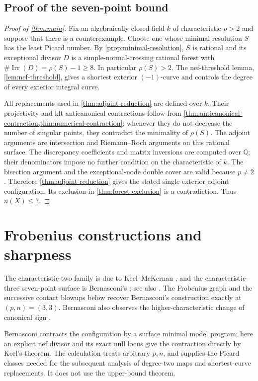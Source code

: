 \documentclass[11pt,reqno]{amsart}
\theoremstyle{definition}
\theoremstyle{remark}
\DeclareMathOperator{\Irr}{Irr}
\newcommand{\QQ}{\mathbb Q}
\numberwithin{equation}{section}
\begin{document}
\subsection{Proof of the seven-point bound}
\begin{proof}[Proof of \cref{thm:main}]
Fix an algebraically closed field $k$ of characteristic $p>2$ and
suppose that there is a counterexample. Choose one whose minimal
resolution $S$ has the least Picard number. By
\cref{prop:minimal-resolution}, $S$ is rational and its exceptional divisor
$D$ is a simple-normal-crossing rational forest with
$\#\Irr(D)=\rho(S)-1\ge8$. In particular $\rho(S)>2$.
The nef-threshold lemma, \cref{lem:nef-threshold}, gives a
shortest exterior $(-1)$-curve and controls the degree of every
exterior integral curve.

All replacements used in \cref{thm:adjoint-reduction}
are defined over $k$. Their projectivity and klt anticanonical
contractions follow from \cref{thm:anticanonical-contraction,thm:numerical-contraction};
whenever they do not decrease the number of singular points, they
contradict the minimality of $\rho(S)$. The adjoint arguments are
intersection and Riemann--Roch arguments on this rational surface.
The discrepancy coefficients and matrix inversions are computed over
$\QQ$; their denominators impose no further condition on the
characteristic of $k$.
The bisection argument and the exceptional-node double cover are
valid because $p\ne2$. Therefore
\cref{thm:adjoint-reduction} gives the stated single
exterior adjoint configuration. Its exclusion in
\cref{thm:forest-exclusion} is a contradiction.
Thus $n(X)\le7$.
\end{proof}


\section{Frobenius constructions and sharpness}
\label{sec:examples}

The characteristic-two family is due to Keel--McKernan
\cite[Section~9]{KeelMcKernan}, and the characteristic-three seven-point
surface is Bernasconi's \cite[Section~3.1 and Proposition~3.2]{Bernasconi};
see also \cite[Example~7.4]{Lacini}. The Frobenius graph and the
successive contact blowups below recover Bernasconi's construction
exactly at $(p,n)=(3,3)$. Bernasconi also observes the higher-characteristic change of canonical
sign \cite[Remark~3.3]{Bernasconi}.

Bernasconi contracts the configuration by a surface minimal model
program; here an explicit nef divisor and its exact null locus give
the contraction directly by Keel's theorem. The calculation treats
arbitrary $p,n$, and supplies the Picard classes needed for the
subsequent analysis of degree-two maps and shortest-curve replacements.
It does not use the upper-bound theorem.
\end{document}
